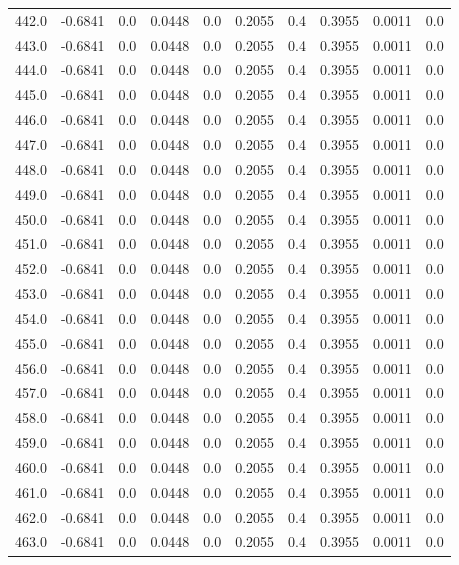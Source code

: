 \begin{longtable}{lrrrrrrrrr}
442.0 & -0.6841 & 0.0 & 0.0448 & 0.0 & 0.2055 & 0.4 & 0.3955 & 0.0011 & 0.0 \\
443.0 & -0.6841 & 0.0 & 0.0448 & 0.0 & 0.2055 & 0.4 & 0.3955 & 0.0011 & 0.0 \\
444.0 & -0.6841 & 0.0 & 0.0448 & 0.0 & 0.2055 & 0.4 & 0.3955 & 0.0011 & 0.0 \\
445.0 & -0.6841 & 0.0 & 0.0448 & 0.0 & 0.2055 & 0.4 & 0.3955 & 0.0011 & 0.0 \\
446.0 & -0.6841 & 0.0 & 0.0448 & 0.0 & 0.2055 & 0.4 & 0.3955 & 0.0011 & 0.0 \\
447.0 & -0.6841 & 0.0 & 0.0448 & 0.0 & 0.2055 & 0.4 & 0.3955 & 0.0011 & 0.0 \\
448.0 & -0.6841 & 0.0 & 0.0448 & 0.0 & 0.2055 & 0.4 & 0.3955 & 0.0011 & 0.0 \\
449.0 & -0.6841 & 0.0 & 0.0448 & 0.0 & 0.2055 & 0.4 & 0.3955 & 0.0011 & 0.0 \\
450.0 & -0.6841 & 0.0 & 0.0448 & 0.0 & 0.2055 & 0.4 & 0.3955 & 0.0011 & 0.0 \\
451.0 & -0.6841 & 0.0 & 0.0448 & 0.0 & 0.2055 & 0.4 & 0.3955 & 0.0011 & 0.0 \\
452.0 & -0.6841 & 0.0 & 0.0448 & 0.0 & 0.2055 & 0.4 & 0.3955 & 0.0011 & 0.0 \\
453.0 & -0.6841 & 0.0 & 0.0448 & 0.0 & 0.2055 & 0.4 & 0.3955 & 0.0011 & 0.0 \\
454.0 & -0.6841 & 0.0 & 0.0448 & 0.0 & 0.2055 & 0.4 & 0.3955 & 0.0011 & 0.0 \\
455.0 & -0.6841 & 0.0 & 0.0448 & 0.0 & 0.2055 & 0.4 & 0.3955 & 0.0011 & 0.0 \\
456.0 & -0.6841 & 0.0 & 0.0448 & 0.0 & 0.2055 & 0.4 & 0.3955 & 0.0011 & 0.0 \\
457.0 & -0.6841 & 0.0 & 0.0448 & 0.0 & 0.2055 & 0.4 & 0.3955 & 0.0011 & 0.0 \\
458.0 & -0.6841 & 0.0 & 0.0448 & 0.0 & 0.2055 & 0.4 & 0.3955 & 0.0011 & 0.0 \\
459.0 & -0.6841 & 0.0 & 0.0448 & 0.0 & 0.2055 & 0.4 & 0.3955 & 0.0011 & 0.0 \\
460.0 & -0.6841 & 0.0 & 0.0448 & 0.0 & 0.2055 & 0.4 & 0.3955 & 0.0011 & 0.0 \\
461.0 & -0.6841 & 0.0 & 0.0448 & 0.0 & 0.2055 & 0.4 & 0.3955 & 0.0011 & 0.0 \\
462.0 & -0.6841 & 0.0 & 0.0448 & 0.0 & 0.2055 & 0.4 & 0.3955 & 0.0011 & 0.0 \\
463.0 & -0.6841 & 0.0 & 0.0448 & 0.0 & 0.2055 & 0.4 & 0.3955 & 0.0011 & 0.0 \\

\end{longtable}
